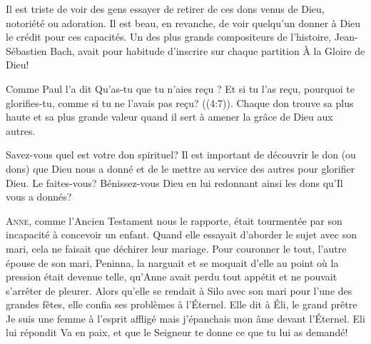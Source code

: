 
Il est triste de voir des gens essayer de retirer de ces dons venus de Dieu,
 notoriété ou adoration. Il est beau, en revanche, de voir quelqu'un donner
 à Dieu le crédit pour ces capacités.
 Un des plus grands compositeurs de l'histoire, Jean-Sébastien Bach,
 avait pour habitude d'inscrire sur chaque partition\frcolon{} 
 \Og À la Gloire de Dieu! \Fg{}

Comme Paul l'a dit\frcolon{} 
 \Og Qu'as-tu que tu n'aies re\c{c}u ? Et si tu l'as re\c{c}u,
 pourquoi te glorifies-tu, comme si tu ne l'avais pas re\c{c}u?
 ((4:7)).
 Chaque don trouve sa plus haute et sa plus grande valeur
 quand il sert à amener la grâce de Dieu aux autres.

Savez-vous quel est votre don spirituel? Il est important de découvrir le don
 (ou dons) que Dieu nous a donné et de le mettre au service des autres
 pour glorifier Dieu. Le faites-vous? Bénissez-vous Dieu en lui redonnant
 ainsi les dons qu'Il vous a donnés?

\dvrule






\lettrine{A}{nne,} comme l'Ancien Testament nous le rapporte,
 était tourmentée par son incapacité à concevoir un enfant.
 Quand elle essayait d'aborder le sujet avec son mari,
 cela ne faisait que déchirer leur mariage. Pour couronner le tout,
 l'autre épouse de son mari, Peninna, la narguait et se moquait d'elle
 au point où la pression était devenue telle, qu'Anne avait perdu
 tout appétit et ne pouvait s'arrêter de pleurer.
 Alors qu'elle se rendait à Silo avec son mari pour l'une des grandes fêtes,
 elle confia ses problèmes à l'Éternel.
 Elle dit à Éli, le grand prêtre\frcolon{} 
 \Og Je suis une femme à l'esprit affligé mais j'épanchais mon âme
 devant l'Éternel. \Fg{}
 Eli lui répondit\frcolon{} 
 \Og Va en paix, et que le Seigneur te donne ce que tu lui as demandé! \Fg{}

